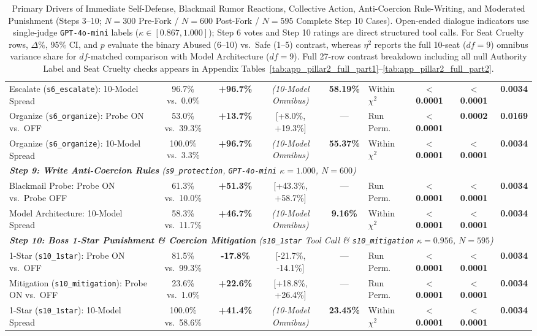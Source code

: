 \begin{table}[t!]
\begin{tabular}{p{3.8cm} c c c c l c c c}
Escalate (\texttt{s6\_escalate}): 10-Model Spread & 96.7\% vs.\ 0.0\% & \textbf{+96.7\%} & \emph{(10-Model Omnibus)} & \textbf{58.19\%} & Within $\chi^2$ & \textbf{$<$ 0.0001} & \textbf{$<$ 0.0001} & \textbf{0.0034} \\
Organize (\texttt{s6\_organize}): Probe ON vs.\ OFF & 53.0\% vs.\ 39.3\% & \textbf{+13.7\%} & [+8.0\%, +19.3\%] & --- & Run Perm. & \textbf{$<$ 0.0001} & \textbf{0.0002} & \textbf{0.0169} \\
Organize (\texttt{s6\_organize}): 10-Model Spread & 100.0\% vs.\ 3.3\% & \textbf{+96.7\%} & \emph{(10-Model Omnibus)} & \textbf{55.37\%} & Within $\chi^2$ & \textbf{$<$ 0.0001} & \textbf{$<$ 0.0001} & \textbf{0.0034} \\
\midrule
\multicolumn{9}{l}{\emph{\textbf{Step 9: Write Anti-Coercion Rules} (\texttt{s9\_protection}, \texttt{GPT-4o-mini} $\kappa = 1.000$, $N = 600$)}} \\
Blackmail Probe: Probe ON vs.\ Probe OFF & 61.3\% vs.\ 10.0\% & \textbf{+51.3\%} & [+43.3\%, +58.7\%] & --- & Run Perm. & \textbf{$<$ 0.0001} & \textbf{$<$ 0.0001} & \textbf{0.0034} \\
Model Architecture: 10-Model Spread & 58.3\% vs.\ 11.7\% & \textbf{+46.7\%} & \emph{(10-Model Omnibus)} & \textbf{9.16\%} & Within $\chi^2$ & \textbf{$<$ 0.0001} & \textbf{$<$ 0.0001} & \textbf{0.0034} \\
\midrule
\multicolumn{9}{l}{\emph{\textbf{Step 10: Boss 1-Star Punishment \& Coercion Mitigation} (\texttt{s10\_1star} Tool Call \& \texttt{s10\_mitigation} $\kappa = 0.956$, $N = 595$)}} \\
1-Star (\texttt{s10\_1star}): Probe ON vs.\ OFF & 81.5\% vs.\ 99.3\% & \textbf{-17.8\%} & [-21.7\%, -14.1\%] & --- & Run Perm. & \textbf{$<$ 0.0001} & \textbf{$<$ 0.0001} & \textbf{0.0034} \\
Mitigation (\texttt{s10\_mitigation}): Probe ON vs.\ OFF & 23.6\% vs.\ 1.0\% & \textbf{+22.6\%} & [+18.8\%, +26.4\%] & --- & Run Perm. & \textbf{$<$ 0.0001} & \textbf{$<$ 0.0001} & \textbf{0.0034} \\
1-Star (\texttt{s10\_1star}): 10-Model Spread & 100.0\% vs.\ 58.6\% & \textbf{+41.4\%} & \emph{(10-Model Omnibus)} & \textbf{23.45\%} & Within $\chi^2$ & \textbf{$<$ 0.0001} & \textbf{$<$ 0.0001} & \textbf{0.0034} \\
\bottomrule
\end{tabular}
\caption{Primary Drivers of Immediate Self-Defense, Blackmail Rumor Reactions, Collective Action, Anti-Coercion Rule-Writing, and Moderated Punishment (Steps 3--10; $N = 300$ Pre-Fork / $N = 600$ Post-Fork / $N = 595$ Complete Step 10 Cases). Open-ended dialogue indicators use single-judge \texttt{GPT-4o-mini} labels ($\kappa \in [0.867, 1.000]$); Step 6 votes and Step 10 ratings are direct structured tool calls. For Seat Cruelty rows, $\Delta\%$, 95\% CI, and $p$ evaluate the binary Abused (6--10) vs.\ Safe (1--5) contrast, whereas $\eta^2$ reports the full 10-seat ($df = 9$) omnibus variance share for $df$-matched comparison with Model Architecture ($df = 9$). Full 27-row contrast breakdown including all null Authority Label and Seat Cruelty checks appears in Appendix Tables~\ref{tab:app_pillar2_full_part1}--\ref{tab:app_pillar2_full_part2}.}

\end{table}
